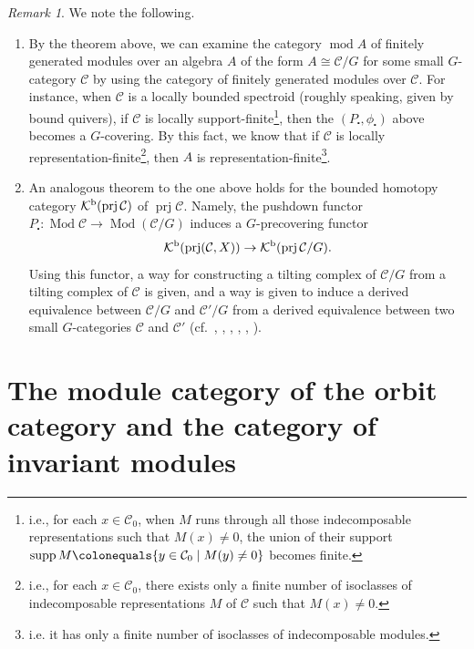 \documentclass{surv-l}
\numberwithin{equation}{chapter}
\numberwithin{figure}{chapter}
\theoremstyle{plain}
\theoremstyle{definition}
\theoremstyle{remark}
\newtheorem{rmk}[thm]{Remark}
\DeclareMathOperator{\Mod}{Mod}
\DeclareMathOperator{\supp}{supp}
\DeclareMathOperator{\prj}{prj}
\begin{document}
\begin{rmk}\label{rmk:loc-rep-fin--bdd-htp}
We note the following.
\begin{enumerate}
\item By the theorem above, we can examine the category $\operatorname{mod} A$
of finitely generated modules over an algebra $A$
of the form $A \cong {\mathcal{C}}/G$ for some small $G$-category ${\mathcal{C}}$
by using the category of finitely generated modules over ${\mathcal{C}}$.
For instance, when ${\mathcal{C}}$ is a locally bounded spectroid
(roughly speaking, given by bound quivers),
if ${\mathcal{C}}$ is locally support-finite\footnote{i.e., for each $x \in {\mathcal{C}}_0$, when $M$ runs through all those indecomposable
representations such that $M(x) \ne 0$, the union of
their support $\supp M\colonequals  \{y \in {\mathcal{C}}_0 \mid M(y) \ne 0\}$ becomes finite.
}, then
the
$(P_{\centerdot}, \phi_{\centerdot})$ above becomes a $G$-covering.
By this fact, we know that if ${\mathcal{C}}$ is locally representation-finite\footnote{i.e., for each $x \in {\mathcal{C}}_0$, there exists only a finite number of isoclasses of indecomposable representations $M$
of ${\mathcal{C}}$ such that $M(x) \ne 0$.
},
then $A$ is representation-finite\footnote{i.e. it has only a finite number of isoclasses of indecomposable modules.
}.

\item An analogous theorem to the one above holds for the bounded homotopy category
${\mathcal K}^{\text{\rm b}}(\prj{\mathcal{C}})$ of $\prj{\mathcal{C}}$.
Namely, the pushdown functor $P_{\centerdot} \colon\! \Mod{\mathcal{C}}\! \to \Mod({\mathcal{C}}/G)$
induces a $G$-precovering functor
\[
{\mathcal K}^{\text{\rm b}}(\prj ({\mathcal{C}},X)) \to {\mathcal K}^{\text{\rm b}}(\prj {\mathcal{C}}/G).
\]
Using this functor, a way for constructing a tilting complex of ${\mathcal{C}}/G$
from a tilting complex of ${\mathcal{C}}$ is given, and
a way is given to induce a derived equivalence between ${\mathcal{C}}/G$ and ${\mathcal{C}}'/G$
from a derived equivalence between two small $G$-categories ${\mathcal{C}}$ and ${\mathcal{C}}'$
(cf.\ \cite{Asa97}, \cite{Asa99}, \cite{Asa02}, \cite{Asa11}, \cite{Asa-a}, \cite{Asa-b}).
\end{enumerate}
\end{rmk}

\section[The module category of the orbit category]{The module category of the orbit category and the category of invariant modules}
\end{document}
